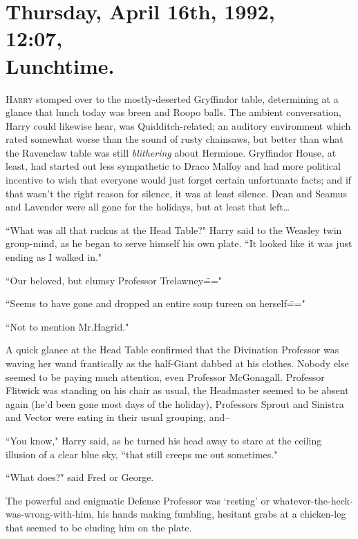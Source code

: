 
\section{Thursday, April 16th, 1992,\\
12:07\pm,\\
Lunchtime.}

\lettrine{H}{arry} stomped over to the mostly-deserted Gryffindor table, determining at a glance that lunch today was breen and Roopo balls. The ambient conversation, Harry could likewise hear, was Quidditch-related; an auditory environment which rated somewhat worse than the sound of rusty chainsaws, but better than what the Ravenclaw table was still \emph{blithering} about Hermione. Gryffindor House, at least, had started out less sympathetic to Draco Malfoy and had more political incentive to wish that everyone would just forget certain unfortunate facts; and if that wasn't the right reason for silence, it was at least silence. Dean and Seamus and Lavender were all gone for the holidays, but at least that left{\ldots}

``What was all that ruckus at the Head Table?" Harry said to the Weasley twin group-mind, as he began to serve himself his own plate. ``It looked like it was just ending as I walked in."

``Our beloved, but clumsy Professor Trelawney\==="

``Seems to have gone and dropped an entire soup tureen on herself\==="

``Not to mention Mr.\?Hagrid."

A quick glance at the Head Table confirmed that the Divination Professor was waving her wand frantically as the half-Giant dabbed at his clothes. Nobody else seemed to be paying much attention, even Professor McGonagall. Professor Flitwick was standing on his chair as usual, the Headmaster seemed to be absent again (he'd been gone most days of the holiday), Professors Sprout and Sinistra and Vector were eating in their usual grouping, and\---

``You know," Harry said, as he turned his head away to stare at the ceiling illusion of a clear blue sky, ``that still creeps me out sometimes."

``What does?" said Fred or George.

The powerful and enigmatic Defense Professor was `resting' or whatever-the-heck-was-wrong-with-him, his hands making fumbling, hesitant grabs at a chicken-leg that seemed to be eluding him on the plate.

